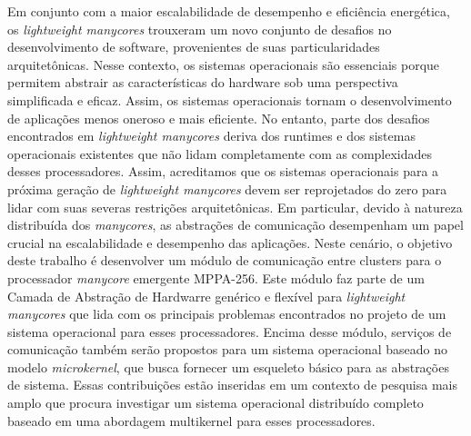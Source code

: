 \begin{resumo}[brazil]
Em conjunto com a maior escalabilidade de desempenho e eficiência energética,
os \textit{lightweight manycores} trouxeram um novo conjunto de desafios no
desenvolvimento de software, provenientes de suas particularidades arquitetônicas.
Nesse contexto, os sistemas operacionais são essenciais porque permitem abstrair
as características do hardware sob uma perspectiva simplificada e eficaz.
Assim, os sistemas operacionais tornam o desenvolvimento de aplicações
menos oneroso e mais eficiente.
No entanto, parte dos desafios encontrados em \textit{lightweight manycores}
deriva dos runtimes e dos sistemas operacionais existentes que não lidam
completamente com as complexidades desses processadores.
Assim, acreditamos que os sistemas operacionais para a próxima geração de
\textit{lightweight manycores} devem ser reprojetados do zero para lidar
com suas severas restrições arquitetônicas.
Em particular, devido à natureza distribuída dos \textit{manycores}, as
abstrações de comunicação desempenham um papel crucial na escalabilidade
e desempenho das aplicações.
Neste cenário, o objetivo deste trabalho é desenvolver um módulo de comunicação
entre clusters para o processador \textit{manycore} emergente MPPA-256.
Este módulo faz parte de um Camada de Abstração de Hardwarre genérico e
flexível para \textit{lightweight manycores} que lida com os principais
problemas encontrados no projeto de um sistema operacional para esses processadores.
Encima desse módulo, serviços de comunicação também serão propostos para
um sistema operacional baseado no modelo \textit{microkernel}, que busca
fornecer um esqueleto básico para as abstrações de sistema.
Essas contribuições estão inseridas em um contexto de pesquisa mais amplo
que procura investigar um sistema operacional distribuído completo baseado
em uma abordagem multikernel para esses processadores.
\end{resumo}

